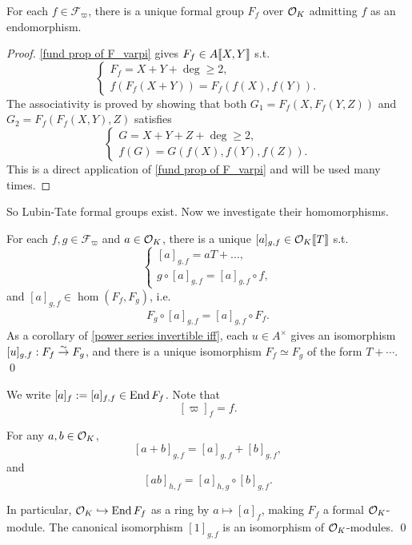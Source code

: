 \begin{proposition}
    For each $f\in \mathcal{F}_\varpi$, there is a unique formal group $F_f$ over $\mathcal{O}_K$ admitting $f$ as an endomorphism.
\end{proposition}
\begin{proof}
    \cref{fund prop of F_varpi} gives $F_f\in A\llbracket X, Y \rrbracket$ s.t. \[\begin{cases}
        F_f = X + Y + \deg \ge 2,\\
        f(F_f(X+Y)) = F_f(f(X), f(Y)).
    \end{cases}\]
    The associativity is proved by showing that both $G_1 = F_f(X, F_f(Y, Z))$ and $G_2 = F_f(F_f(X, Y), Z)$ satisfies 
    \[\begin{cases}
        G = X+Y+Z + \deg\ge 2,\\
        f(G) = G(f(X), f(Y), f(Z)).
    \end{cases}\]
    This is a direct application of \cref{fund prop of F_varpi} and will be used many times.
\end{proof}

So Lubin-Tate formal groups exist. Now we investigate their homomorphisms.
\begin{proposition}
    For each $f, g\in\mathcal{F}_\varpi$ and $a\in \mathcal{O}_K$, there is a unique $[a]_{g, f}\in \mathcal{O}_K\llbracket T \rrbracket$ s.t. \[\begin{cases}
        [a]_{g, f} = aT + \dots,\\
        g\circ [a]_{g, f} = [a]_{g, f} \circ f,
    \end{cases}\]and $[a]_{g, f}\in\hom(F_f, F_g)$, i.e. \begin{align*} F_g\circ [a]_{g, f} = [a]_{g, f}\circ F_f.\end{align*}
    As a corollary of \cref{power series invertible iff}, each $u\in A^\times$ gives an isomorphism $[u]_{g, f} : F_f\stackrel{\sim}{\rightarrow} F_g$, and there is a unique isomorphism $F_f\simeq F_g$ of the form $T + \cdots$.
    \qed
\end{proposition}

We write $[a]_{f} := [a]_{f, f}\in\operatorname{End} F_f$.
Note that \[[\varpi]_f = f.\]

\begin{proposition}
    For any $a, b\in\mathcal{O}_K$, \[[a+b]_{g, f} = [a]_{g, f} + [b]_{g, f},\]and\[[ab]_{h, f} = [a]_{h, g}\circ [b]_{g, f}.\]
    
    In particular, $\mathcal{O}_K\hookrightarrow\operatorname{End}  F_f$ as a ring by $a\mapsto [a]_f$, making $F_f$ a formal $\mathcal{O}_K$-module. The canonical isomorphism $[1]_{g, f}$ is an isomorphism of $\mathcal{O}_K$-modules.
    \qed
\end{proposition}

